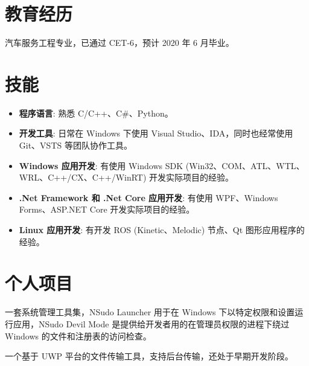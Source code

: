 \documentclass{resume}
\begin{document}
\renewcommand\headrulewidth{0pt}



\section{教育经历}

  汽车服务工程专业，已通过 CET-6，预计 2020 年 6 月毕业。

\section{技能}
\begin{itemize}

  \item \textbf{程序语言}:
    熟悉 C/C++、C\#、Python。

  \item \textbf{开发工具}:
    日常在 Windows 下使用 Visual Studio、IDA，同时也经常使用 Git、VSTS 等团队协作工具。

  \item \textbf{Windows 应用开发}:
    有使用 Windows SDK (Win32、COM、ATL、WTL、WRL、C++/CX、C++/WinRT) 开发实际项目的经验。

  \item \textbf{.Net Framework 和 .Net Core 应用开发}:
    有使用 WPF、Windows Forms、ASP.NET Core 开发实际项目的经验。
  
  \item \textbf{Linux 应用开发}:
    有开发 ROS (Kinetic、Melodic) 节点、Qt 图形应用程序的经验。

\end{itemize}

\section{个人项目}

一套系统管理工具集，NSudo Launcher 用于在 Windows 下以特定权限和设置运行应用，NSudo Devil Mode 是提供给开发者用的在管理员权限的进程下绕过 Windows 的文件和注册表的访问检查。

一个基于 UWP 平台的文件传输工具，支持后台传输，还处于早期开发阶段。
\end{document}
